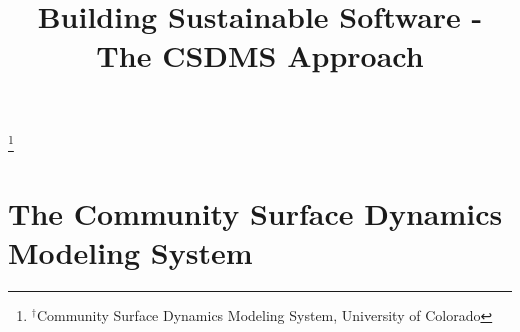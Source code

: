 \documentclass[11pt, oneside]{amsart}
\DeclareRobustCommand{\csdms}{\textsc{csdms}}
\begin{document}
\title[]{Building Sustainable Software - The CSDMS Approach}


\thanks{{}$^{\dag}$Community Surface Dynamics Modeling System, University of
Colorado}




\maketitle

\section{The Community Surface Dynamics Modeling System}
\end{document}
